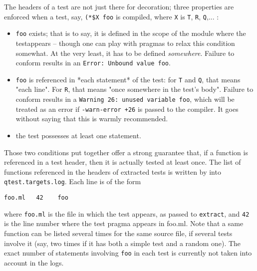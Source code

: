 
The headers of a test are not just there for decoration; three properties are enforced
when a test, say, \texttt{(*\$X foo} is compiled, where \texttt{X} is
\texttt{T}, \texttt{R}, \texttt{Q},... :

\begin{itemize}

\item  \texttt{foo} exists; that is to say, it is defined in the scope of the module where the testappears -- though one can play with pragmas to relax this condition somewhat. At the very
least, it has to be defined \emph{somewhere}. Failure to conform results in an \texttt{Error: Unbound
value foo}.

\item  \texttt{foo} is referenced in *each statement* of the test: for \texttt{T} and \texttt{Q}, that means "each
line". For \texttt{R}, that means "once somewhere in the test's body". Failure to conform results
in a \texttt{Warning 26: unused variable foo}, which will be treated as an error if \texttt{-warn-error
+26} is passed to the compiler. It goes without saying that this is warmly recommended.

\item  the test possesses at least one statement.
\end{itemize}

Those two conditions put together offer a strong guarantee that, if a function is
referenced in a test header, then it is actually tested at least once. The list of
functions referenced in the headers of extracted tests is written by \qtest{} into
\texttt{qtest.targets.log}. Each line is of the form

\begin{verbatim}
foo.ml   42    foo
\end{verbatim}

where \texttt{foo.ml} is the file in which the test appears, as passed to \texttt{extract},
 and \texttt{42} is
the line number where the test pragma appears in foo.ml. Note that a same function can be
listed several times for the same source file, if several tests involve it (say, two times
if it has both a simple test and a random one). The exact number of statements involving
\texttt{foo} in each test is currently not taken into account in the logs.
